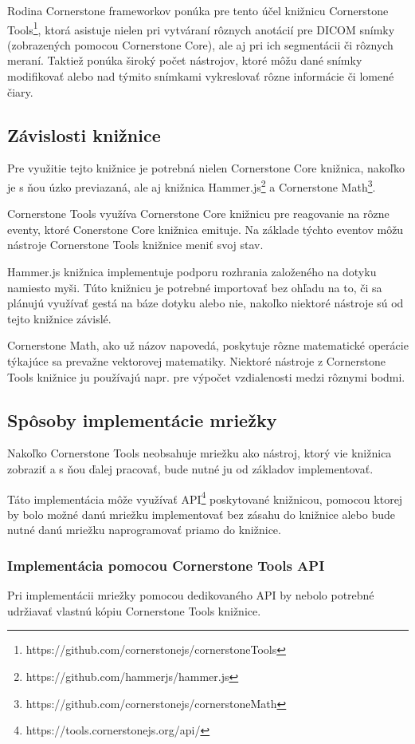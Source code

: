 Rodina Cornerstone frameworkov ponúka pre tento účel knižnicu Cornerstone Tools\footnote{https://github.com/cornerstonejs/cornerstoneTools}, ktorá asistuje nielen pri vytváraní rôznych anotácií pre DICOM snímky (zobrazených pomocou Cornerstone Core), ale aj pri ich segmentácii či rôznych meraní. Taktiež ponúka široký počet nástrojov, ktoré môžu dané snímky modifikovať alebo nad týmito snímkami vykreslovať rôzne informácie či lomené čiary.

\subsection {Závislosti knižnice}
Pre využitie tejto knižnice je potrebná nielen Cornerstone Core knižnica, nakoľko je s ňou úzko previazaná, ale aj knižnica Hammer.js\footnote{https://github.com/hammerjs/hammer.js} a Cornerstone Math\footnote{https://github.com/cornerstonejs/cornerstoneMath}.

Cornerstone Tools využíva Cornerstone Core knižnicu pre reagovanie na rôzne eventy, ktoré Conerstone Core knižnica emituje. Na základe týchto eventov môžu nástroje Cornerstone Tools knižnice meniť svoj stav.

Hammer.js knižnica implementuje podporu rozhrania založeného na dotyku namiesto myši. Túto knižnicu je potrebné importovať bez ohľadu na to, či sa plánujú využívať gestá na báze dotyku alebo nie, nakoľko niektoré nástroje sú od tejto knižnice závislé.

Cornerstone Math, ako už názov napovedá, poskytuje rôzne matematické operácie týkajúce sa prevažne vektorovej matematiky. Niektoré nástroje z Cornerstone Tools knižnice ju používajú napr. pre výpočet vzdialenosti medzi rôznymi bodmi.

\subsection {Spôsoby implementácie mriežky}
Nakoľko Cornerstone Tools neobsahuje mriežku ako nástroj, ktorý vie knižnica zobraziť a s ňou ďalej pracovať, bude nutné ju od základov implementovať.

Táto implementácia môže využívať API\footnote{https://tools.cornerstonejs.org/api/} poskytované knižnicou, pomocou ktorej by bolo možné danú mriežku implementovať bez zásahu do knižnice alebo bude nutné danú mriežku naprogramovať priamo do knižnice.

\subsubsection {Implementácia pomocou Cornerstone Tools API}
Pri implementácii mriežky pomocou dedikovaného API by nebolo potrebné udržiavať vlastnú kópiu Cornerstone Tools knižnice.

